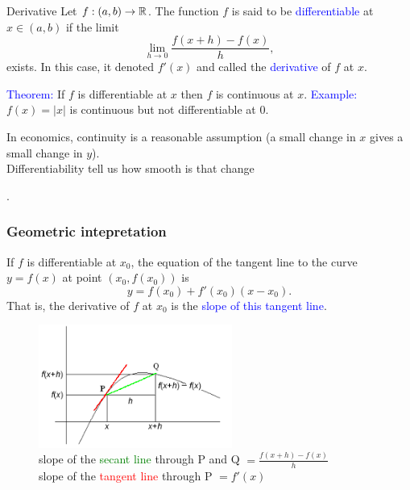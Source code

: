 \documentclass[11pt,aspectratio=169]{beamer}
\begin{document}
\begin{frame}{Derivative}
Let $f:(a,b) \rightarrow \mathbb R$. The function $f$ is said to be \textcolor{blue}{differentiable} at $x \in (a,b)$ if the limit
$$
\lim_{h \rightarrow 0} \frac{f(x+h)-f(x)}{h},
$$
exists. In this case, it denoted $f'(x)$ and called the \textcolor{blue}{derivative} of $f$ at $x$.

\vskip 12pt
\vskip 12pt

\textcolor{blue}{Theorem:} If $f$ is differentiable at $x$ then $f$ is continuous at $x$.
\vskip 12pt
\textcolor{blue}{Example:} $f(x)=\vert x\vert$ is continuous but not differentiable at $0$.
\vskip 12pt
\begin{tiny}In economics, continuity is a reasonable assumption (a small change in $x$ gives a small change in $y$).\\ 
Differentiability tell us how smooth is that change\end{tiny}.


\end{frame}

\begin{frame}
\frametitle{Geometric intepretation}
If $f$ is differentiable at $x_0$, the equation of the tangent  line
to the curve $y=f(x)$ at point $(x_0, f(x_0))$ is
$$
y=f(x_0)+f'(x_0)(x-x_0).
$$
That is, the derivative of $f$ at $x_0$ is the \textcolor{blue}{slope of this tangent line}.
\begin{figure}
\includegraphics[width=2.5in]{img/derivative} \\
slope of the \textcolor{green}{secant line} through P and Q $=\frac{f(x+h)-f(x)}{h}$\\
slope of the \textcolor{red}{tangent line} through P $=f'(x)$%
\end{figure}
\end{frame}
\end{document}

